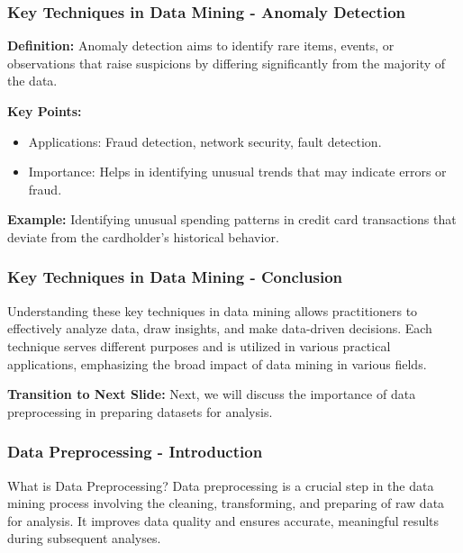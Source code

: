 \documentclass{beamer}
\begin{document}
\begin{frame}[fragile]
    \frametitle{Key Techniques in Data Mining - Anomaly Detection}
    \textbf{Definition:}   
    Anomaly detection aims to identify rare items, events, or observations that raise suspicions by differing significantly from the majority of the data.

    \textbf{Key Points:}
    \begin{itemize}
        \item Applications: Fraud detection, network security, fault detection.
        \item Importance: Helps in identifying unusual trends that may indicate errors or fraud.
    \end{itemize}

    \textbf{Example:}  
    Identifying unusual spending patterns in credit card transactions that deviate from the cardholder's historical behavior.

\end{frame}

\begin{frame}[fragile]
    \frametitle{Key Techniques in Data Mining - Conclusion}
    Understanding these key techniques in data mining allows practitioners to effectively analyze data, draw insights, and make data-driven decisions. Each technique serves different purposes and is utilized in various practical applications, emphasizing the broad impact of data mining in various fields.

    \textbf{Transition to Next Slide:}  
    Next, we will discuss the importance of data preprocessing in preparing datasets for analysis.
\end{frame}

\begin{frame}[fragile]
    \frametitle{Data Preprocessing - Introduction}
    \begin{block}{What is Data Preprocessing?}
        Data preprocessing is a crucial step in the data mining process involving the cleaning, transforming, and preparing of raw data for analysis. 
        It improves data quality and ensures accurate, meaningful results during subsequent analyses.
    \end{block}
\end{frame}
\end{document}
